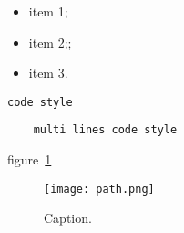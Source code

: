 \begin{itemize}
    \item item 1;
    \item item 2;;
    \item item 3.
\end{itemize}

\verb|code style| %
    
\begin{verbatim}
    multi lines code style
\end{verbatim}

figure~\ref{fig:ref_fig}

\begin{figure}[p]
    \centering
    \texttt{[image: path.png]}
    \caption{Caption.}
    \label{fig:ref_fig}
\end{figure}


